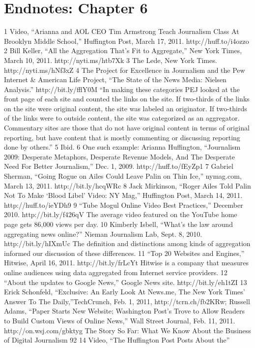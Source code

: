 \section{Endnotes: Chapter 6}
1 Video, ``Arianna and AOL CEO Tim Armstrong Teach Journalism Class At Brooklyn Middle
School,'' Huffington Post, March 17, 2011. http://huff.to/i4ozzo
2 Bill Keller, ``All the Aggregation That’s Fit to Aggregate,'' New York Times, March 10, 2011.
http://nyti.ms/htb7Xk
3 The Lede, New York Times. http://nyti.ms/hNf3xZ
4 The Project for Excellence in Journalism and the Pew Internet & American Life Project,
``The State of the News Media: Nielsen Analysis.'' http://bit.ly/fflY0M ``In making these
categories PEJ looked at the front page of each site and counted the links on the site.
If two-thirds of the links on the site were original content, the site was labeled an originator.
If two-thirds of the links were to outside content, the site was categorized as an aggregator.
Commentary sites are those that do not have original content in terms of original reporting,
but have content that is mostly commenting or discussing reporting done by others.''
5 Ibid.
6 One such example: Arianna Huffington, ``Journalism 2009: Desperate Metaphors,
Desperate Revenue Models, And The Desperate Need For Better Journalism,'' Dec. 1, 2009.
http://huff.to/fEyZp1
7 Gabriel Sherman, ``Going Rogue on Ailes Could Leave Palin on Thin Ice,'' nymag.com,
March 13, 2011. http://bit.ly/hcqWRc
8 Jack Mirkinson, ``Roger Ailes Told Palin Not To Make ‘Blood Libel’ Video: NY Mag,''
Huffington Post, March 14, 2011. http://huff.to/ieYDh9
9 ``Tube Mogul Online Video Best Practices,'' December 2010. http://bit.ly/f426qV The average
video featured on the YouTube home page gets 86,000 views per day.
10 Kimberly Isbell, ``What’s the law around aggregating news online?'' Nieman Journalism
Lab, Sept. 8, 2010. http://bit.ly/hIXmUc The definition and distinctions among kinds of
aggregation informed our discussion of these differences.
11 ``Top 20 Websites and Engines,'' Hitwise, April 16, 2011. http://bit.ly/frLcYt Hitwise is a
company that measures online audiences using data aggregated from Internet service providers.
12 ``About the updates to Google News,'' Google News site. http://bit.ly/eh1tZI
13 Erick Schonfeld, ``Exclusive: An Early Look At News.me, The New York Times’ Answer To
The Daily,''TechCrunch, Feb. 1, 2011, http://tcrn.ch/fb2KRw; Russell Adams, ``Paper Starts
New Website; Washington Post’s Trove to Allow Readers to Build Custom Views of Online
News,'' Wall Street Journal, Feb. 11, 2011. http://on.wsj.com/gbktyg
The Story So Far: What We Know About the Business of Digital Journalism
92
14 Video, ``The Huffington Post Posts About the''


